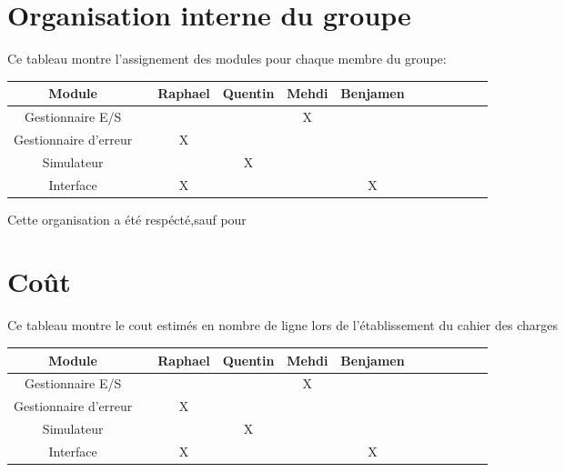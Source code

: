 \documentclass{article}
\begin{document}
\section{Organisation interne du groupe}
Ce tableau montre l'assignement des modules pour chaque membre du groupe:
\begin{tabular}{|c c|c|c|c|c|c|c|c|c|c|c|}

\hline
Module & & Raphael & Quentin & Mehdi & Benjamen\\
\hline
Gestionnaire E/S & &  &  & X &  \\
\hline
Gestionnaire d'erreur & & X &  &  &   \\
\hline
Simulateur & &  & X &  &  \\
\hline
Interface & & X &  &   & X \\
\hline

\end{tabular}




Cette organisation a été respécté,sauf pour
 \section{Coût}
Ce tableau montre le cout estimés en nombre de ligne lors de l'établissement du cahier des charges \newline




\begin{tabular}{|c c|c|c|c|c|c|c|c|c|c|c|}

\hline
Module & & Raphael & Quentin & Mehdi & Benjamen\\
\hline
Gestionnaire E/S & &  &  & X &  \\
\hline
Gestionnaire d'erreur & & X &  &  &   \\
\hline
Simulateur & &  & X &  &  \\
\hline
Interface & & X &  &   & X \\
\hline
\end{tabular}
\end{document}
